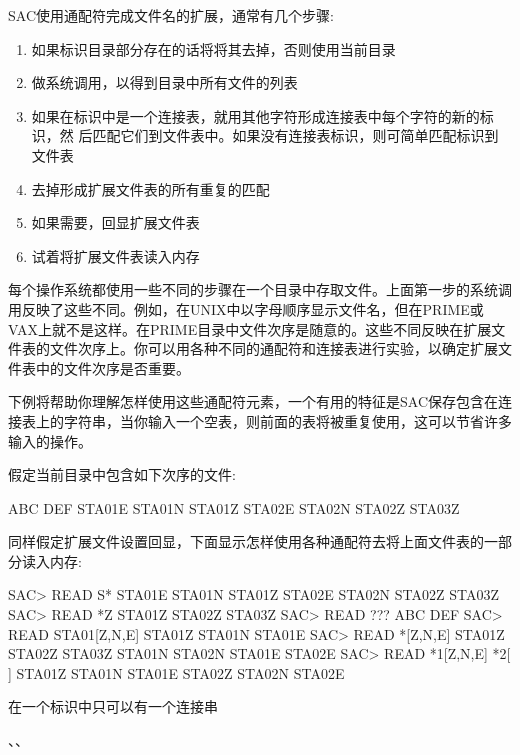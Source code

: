 SAC使用通配符完成文件名的扩展，通常有几个步骤:
\begin{enumerate}
\item 如果标识目录部分存在的话将将其去掉，否则使用当前目录
\item 做系统调用，以得到目录中所有文件的列表
\item 如果在标识中是一个连接表，就用其他字符形成连接表中每个字符的新的标识，然	  后匹配它们到文件表中。如果没有连接表标识，则可简单匹配标识到文件表
\item 去掉形成扩展文件表的所有重复的匹配
\item 如果需要，回显扩展文件表
\item 试着将扩展文件表读入内存
\end{enumerate}

每个操作系统都使用一些不同的步骤在一个目录中存取文件。上面第一步的系统调用反映了这些不同。例如，在UNIX中以字母顺序显示文件名，但在PRIME或VAX上就不是这样。在PRIME目录中文件次序是随意的。这些不同反映在扩展文件表的文件次序上。你可以用各种不同的通配符和连接表进行实验，以确定扩展文件表中的文件次序是否重要。

下例将帮助你理解怎样使用这些通配符元素，一个有用的特征是SAC保存包含在连接表上的字符串，当你输入一个空表，则前面的表将被重复使用，这可以节省许多输入的操作。

假定当前目录中包含如下次序的文件:
\begin{SACCode}
ABC DEF STA01E STA01N STA01Z STA02E STA02N STA02Z STA03Z
\end{SACCode}

同样假定扩展文件设置回显，下面显示怎样使用各种通配符去将上面文件表的一部分读入内存:
\begin{SACCode}
SAC> READ S*
 STA01E STA01N STA01Z STA02E STA02N STA02Z STA03Z
SAC> READ *Z
 STA01Z STA02Z STA03Z
SAC> READ ???
 ABC DEF
SAC> READ STA01[Z,N,E]
 STA01Z STA01N STA01E
SAC> READ *[Z,N,E]
 STA01Z STA02Z STA03Z STA01N STA02N STA01E STA02E
SAC> READ *1[Z,N,E] *2[ ]
 STA01Z STA01N STA01E STA02Z STA02N STA02E
\end{SACCode}

在一个标识中只可以有一个连接串

、、
